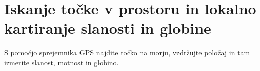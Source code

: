 %
\chapter{Iskanje točke v prostoru in lokalno kartiranje slanosti in globine}
\label{Vaj:KartSlanGlob} %

S pomočjo sprejemnika GPS najdite točko na morju, vzdržujte položaj in tam izmerite slanost, motnost in globino.

